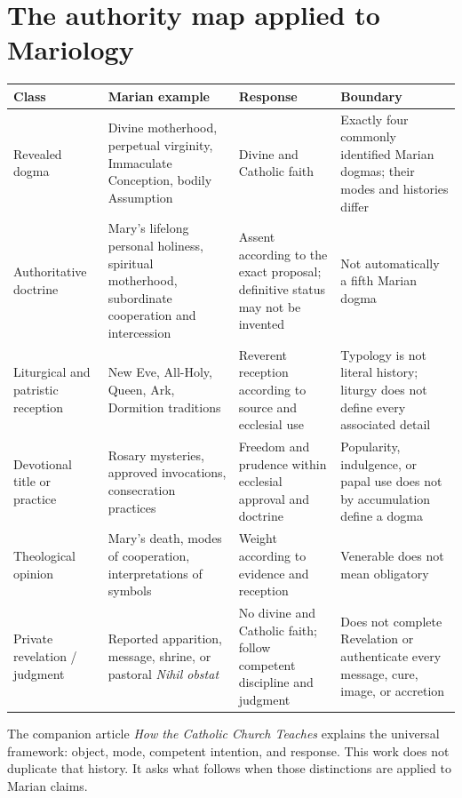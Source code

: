 \section{The authority map applied to Mariology}

\begin{longtable}{>{\raggedright\arraybackslash}p{}>{\raggedright\arraybackslash}p{}>{\raggedright\arraybackslash}p{}>{\raggedright\arraybackslash}p{}}
\toprule
Class & Marian example & Response & Boundary\\
\midrule
\endhead
Revealed dogma & Divine motherhood, perpetual virginity, Immaculate
Conception, bodily Assumption & Divine and Catholic faith & Exactly four
commonly identified Marian dogmas; their modes and histories differ\\
Authoritative doctrine & Mary's lifelong personal holiness, spiritual
motherhood, subordinate cooperation and intercession & Assent according to the
exact proposal; definitive status may not be invented & Not automatically a
fifth Marian dogma\\
Liturgical and patristic reception & New Eve, All-Holy, Queen, Ark, Dormition
traditions & Reverent reception according to source and ecclesial use &
Typology is not literal history; liturgy does not define every associated
detail\\
Devotional title or practice & Rosary mysteries, approved invocations,
consecration practices & Freedom and prudence within ecclesial approval and
doctrine & Popularity, indulgence, or papal use does not by accumulation define
a dogma\\
Theological opinion & Mary's death, modes of cooperation, interpretations of
symbols & Weight according to evidence and reception & Venerable does not mean
obligatory\\
Private revelation / judgment & Reported apparition, message, shrine, or
pastoral \emph{Nihil obstat} & No divine and Catholic faith; follow competent
discipline and judgment & Does not complete Revelation or authenticate every
message, cure, image, or accretion\\
\bottomrule
\end{longtable}

The companion article \emph{How the Catholic Church Teaches} explains the
universal framework: object, mode, competent intention, and response. This work
does not duplicate that history. It asks what follows when those distinctions
are applied to Marian claims.

